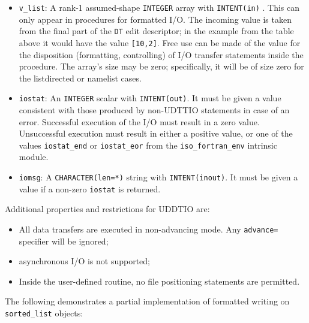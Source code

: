 \documentclass[
]{article}
\providecommand{\tightlist}{%
  \setlength{\itemsep}{0pt}\setlength{\parskip}{0pt}}
\begin{document}
\begin{itemize}
\tightlist
\item
  \texttt{v\_list}: A rank-1 assumed-shape \texttt{INTEGER} array with
  \texttt{INTENT(in)} . This can only appear in procedures for formatted
  I/O. The incoming value is taken from the final part of the
  \texttt{DT} edit descriptor; in the example from the table above it
  would have the value \texttt{{[}10,2{]}}. Free use can be made of the
  value for the disposition (formatting, controlling) of I/O transfer
  statements inside the procedure. The array's size may be zero;
  specifically, it will be of size zero for the listdirected or namelist
  cases.
\item
  \texttt{iostat}: An \texttt{INTEGER} scalar with \texttt{INTENT(out)}.
  It must be given a value consistent with those produced by non-UDTTIO
  statements in case of an error. Successful execution of the I/O must
  result in a zero value. Unsuccessful execution must result in either a
  positive value, or one of the values \texttt{iostat\_end} or
  \texttt{iostat\_eor} from the \texttt{iso\_fortran\_env} intrinsic
  module.
\item
  \texttt{iomsg}: A \texttt{CHARACTER(len=*)} string with
  \texttt{INTENT(inout)}. It must be given a value if a non-zero
  \texttt{iostat} is returned.
\end{itemize}

Additional properties and restrictions for UDDTIO are:

\begin{itemize}
\tightlist
\item
  All data transfers are executed in non-advancing mode. Any
  \texttt{advance=} specifier will be ignored;
\item
  asynchronous I/O is not supported;
\item
  Inside the user-defined routine, no file positioning statements are
  permitted.
\end{itemize}

The following demonstrates a partial implementation of formatted writing
on \texttt{sorted\_list} objects:
\end{document}
